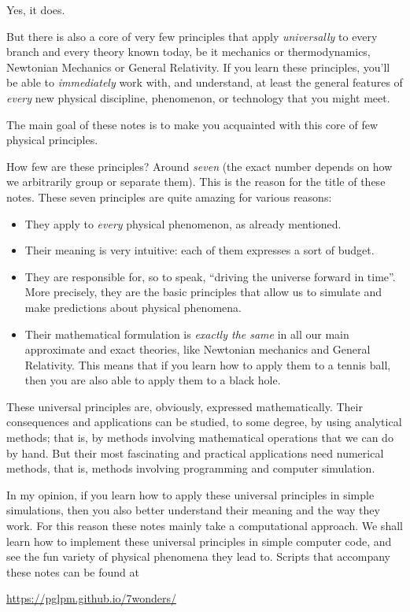 \documentclass[a4paper,12pt,%
onecolumn,oneside,%
british%
]{memoir}
\renewcommand*{\|}[1][]{\nonscript\:#1\vert\nonscript\:\mathopen{}}
\begin{document}
Yes, it does.

But there is also a core of very few principles that apply \emph{universally} to every branch and every theory known today, be it mechanics or thermodynamics, Newtonian Mechanics or General Relativity. If you learn these principles, you'll be able to \emph{immediately} work with, and understand, at least the general features of \emph{every} new physical discipline, phenomenon, or technology that you might meet.

\medskip

The main goal of these notes is to make you acquainted with this core of few physical principles.

How few are these principles? Around \emph{seven} (the exact number depends on how we arbitrarily group or separate them). This is the reason for the title of these notes. These seven principles are quite amazing for various reasons:
\begin{itemize}
\item They apply to \emph{every} physical phenomenon, as already mentioned.
\item Their meaning is very intuitive: each of them expresses a sort of budget.
\item They are responsible for, so to speak, \enquote{driving the universe forward in time}. More precisely, they are the basic principles that allow us to simulate and make predictions about physical phenomena.
\item Their mathematical formulation is \emph{exactly the same} in all our main approximate and exact theories, like Newtonian mechanics and General Relativity. This means that if you learn how to apply them to a tennis ball, then you are also able to apply them to a black hole.
\end{itemize}

\medskip

These universal principles are, obviously, expressed mathematically. Their consequences and applications can be studied, to some degree, by using analytical methods; that is, by methods involving mathematical operations that we can do by hand. But their most fascinating and practical applications need numerical methods, that is, methods involving programming and computer simulation.

In my opinion, if you learn how to apply these universal principles in simple simulations, then you also better understand their meaning and the way they work. For this reason these notes mainly take a computational approach. We shall learn how to implement these universal principles in simple computer code, and see the fun variety of physical phenomena they lead to. Scripts that accompany these notes can be found at
\begin{center}
  \url{https://pglpm.github.io/7wonders/}
\end{center}
\end{document}
